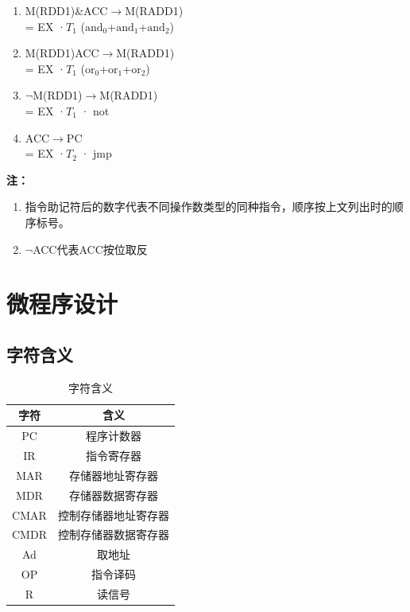 \documentclass[UTF8]{ctexrep}
\begin{document}
\begin{enumerate}
\item M(RDD1)\&ACC$\to$M(RADD1)\\
= EX ·\(T_{1}\) ($\mathrm{and_0}$+$\mathrm{and_1}$+$\mathrm{and_2}$)\\

\item M(RDD1)ACC$\to$M(RADD1)\\
= EX ·\(T_{1}\) ($\mathrm{or_0}$+$\mathrm{or_1}$+$\mathrm{or_2}$)\\

\item $\neg$M(RDD1)$\to$M(RADD1)\\
= EX ·\(T_{1}\) · not\\

\item ACC$\to$PC\\
= EX ·\(T_{2}\) · jmp
\end{enumerate}
\textbf{注：}

\begin{enumerate}
\item 指令助记符后的数字代表不同操作数类型的同种指令，顺序按上文列出时的顺序标号。
\item $\neg$ACC代表ACC按位取反
\end{enumerate}


\chapter{微程序设计}

\section{字符含义}

\begin{table}[H]
\centering
\begin{tabular}{|c|c|}
\hline
字符   & 含义         \\ \hline
PC   & 程序计数器      \\ \hline
IR   & 指令寄存器      \\ \hline
MAR  & 存储器地址寄存器   \\ \hline
MDR  & 存储器数据寄存器   \\ \hline
CMAR & 控制存储器地址寄存器 \\ \hline
CMDR & 控制存储器数据寄存器 \\ \hline
Ad   & 取地址        \\ \hline
OP   & 指令译码       \\ \hline
R    & 读信号        \\ \hline
\end{tabular}
\caption{字符含义}
\label{tab:22}
\end{table}
\end{document}
